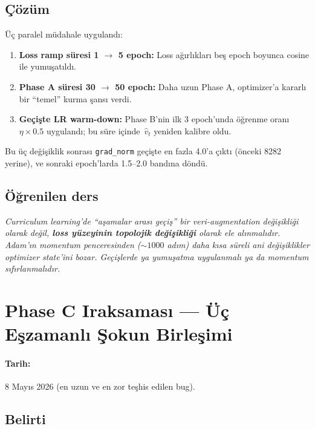\subsection*{Çözüm}

Üç paralel müdahale uygulandı:
\begin{enumerate}
    \item \textbf{Loss ramp süresi 1 $\to$ 5 epoch:} Loss ağırlıkları beş epoch boyunca cosine ile yumuşatıldı.
    \item \textbf{Phase A süresi 30 $\to$ 50 epoch:} Daha uzun Phase A, optimizer'a kararlı bir ``temel'' kurma şansı verdi.
    \item \textbf{Geçişte LR warm-down:} Phase B'nin ilk 3 epoch'unda öğrenme oranı $\eta \times 0.5$ uygulandı; bu süre içinde \,$\hat{v}_t$ yeniden kalibre oldu.
\end{enumerate}

Bu üç değişiklik sonrası \texttt{grad\_norm} geçişte en fazla 4.0'a çıktı (önceki 8282 yerine), ve sonraki epoch'larda 1.5--2.0 bandına döndü.

\subsection*{Öğrenilen ders}

\begin{remark}
\textit{Curriculum learning'de ``aşamalar arası geçiş'' bir veri-augmentation değişikliği olarak değil, \textbf{loss yüzeyinin topolojik değişikliği} olarak ele alınmalıdır. Adam'ın momentum penceresinden ($\sim 1000$ adım) daha kısa süreli ani değişiklikler optimizer state'ini bozar. Geçişlerde ya yumuşatma uygulanmalı ya da momentum sıfırlanmalıdır.}
\end{remark}


\section{Phase C Iraksaması --- Üç Eşzamanlı Şokun Birleşimi}
\label{sec:bug_phase_c}

\paragraph{Tarih:} 8 Mayıs 2026 (en uzun ve en zor teşhis edilen bug).

\subsection*{Belirti}

